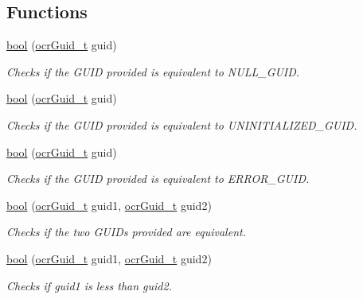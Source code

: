 \subsection*{Functions}
\begin{DoxyCompactItemize}
\item
  \hyperlink{type_bool}{bool} \hyperlink{func_ocrGuidIsNull}
            {}(\hyperlink{type_ocrGuid_t}{ocr\-Guid\-\_\-t} guid)
    \begin{DoxyCompactList}
      \small\item \emph{Checks if the GUID provided is equivalent to NULL\_GUID.}
    \end{DoxyCompactList}
\item
  \hyperlink{type_bool}{bool} \hyperlink{func_ocrGuidIsUninitialized}
            {}(\hyperlink{type_ocrGuid_t}{ocr\-Guid\-\_\-t} guid)
    \begin{DoxyCompactList}
      \small\item \emph{Checks if the GUID provided is equivalent to UNINITIALIZED\_GUID.}
    \end{DoxyCompactList}
\item
  \hyperlink{type_bool}{bool} \hyperlink{func_ocrGuidIsError}
            {}(\hyperlink{type_ocrGuid_t}{ocr\-Guid\-\_\-t} guid)
    \begin{DoxyCompactList}
      \small\item \emph{Checks if the GUID provided is equivalent to ERROR\_GUID.}
    \end{DoxyCompactList}
\item
  \hyperlink{type_bool}{bool} \hyperlink{func_ocrGuidIsEq}
            {}(\hyperlink{type_ocrGuid_t}{ocr\-Guid\-\_\-t} guid1,
    \hyperlink{type_ocrGuid_t}{ocr\-Guid\-\_\-t} guid2)
    \begin{DoxyCompactList}
      \small\item \emph{Checks if the two GUIDs provided are equivalent.}
    \end{DoxyCompactList}
\item
  \hyperlink{type_bool}{bool} \hyperlink{func_ocrGuidIsLt}
            {}(\hyperlink{type_ocrGuid_t}{ocr\-Guid\-\_\-t} guid1,
    \hyperlink{type_ocrGuid_t}{ocr\-Guid\-\_\-t} guid2)
    \begin{DoxyCompactList}
      \small\item \emph{Checks if guid1 is less than guid2.}
    \end{DoxyCompactList}
\end{DoxyCompactItemize}

